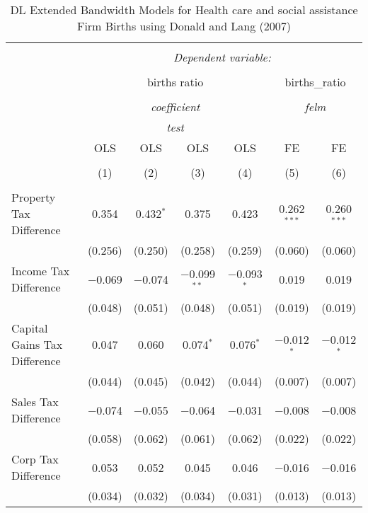 
\begin{table}[!htbp] \centering 
  \caption{DL Extended Bandwidth Models for  Health care and social assistance Firm Births using Donald and Lang (2007)} 
  \label{} 
\begin{tabular}{@{\extracolsep{5pt}}lcccccc} 
\\[-1.8ex]\hline 
\hline \\[-1.8ex] 
 & \multicolumn{6}{c}{\textit{Dependent variable:}} \\ 
\cline{2-7} 
\\[-1.8ex] & \multicolumn{4}{c}{births ratio} & \multicolumn{2}{c}{births\_ratio} \\ 
\\[-1.8ex] & \multicolumn{4}{c}{\textit{coefficient}} & \multicolumn{2}{c}{\textit{felm}} \\ 
 & \multicolumn{4}{c}{\textit{test}} & \multicolumn{2}{c}{\textit{}} \\ 
 & OLS & OLS & OLS & OLS & FE & FE \\ 
\\[-1.8ex] & (1) & (2) & (3) & (4) & (5) & (6)\\ 
\hline \\[-1.8ex] 
 Property Tax Difference & 0.354 & 0.432$^{*}$ & 0.375 & 0.423 & 0.262$^{***}$ & 0.260$^{***}$ \\ 
  & (0.256) & (0.250) & (0.258) & (0.259) & (0.060) & (0.060) \\ 
  Income Tax Difference & $-$0.069 & $-$0.074 & $-$0.099$^{**}$ & $-$0.093$^{*}$ & 0.019 & 0.019 \\ 
  & (0.048) & (0.051) & (0.048) & (0.051) & (0.019) & (0.019) \\ 
  Capital Gains Tax Difference & 0.047 & 0.060 & 0.074$^{*}$ & 0.076$^{*}$ & $-$0.012$^{*}$ & $-$0.012$^{*}$ \\ 
  & (0.044) & (0.045) & (0.042) & (0.044) & (0.007) & (0.007) \\ 
  Sales Tax Difference & $-$0.074 & $-$0.055 & $-$0.064 & $-$0.031 & $-$0.008 & $-$0.008 \\ 
  & (0.058) & (0.062) & (0.061) & (0.062) & (0.022) & (0.022) \\ 
  Corp Tax Difference & 0.053 & 0.052 & 0.045 & 0.046 & $-$0.016 & $-$0.016 \\ 
  & (0.034) & (0.032) & (0.034) & (0.031) & (0.013) & (0.013) \\ 

\end{tabular}
\end{table}
